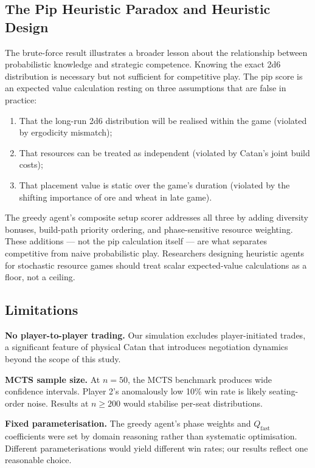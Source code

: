 \documentclass[12pt,a4paper]{article}
\begin{document}
{\subsection{The Pip Heuristic Paradox and Heuristic Design}

The brute-force result illustrates a broader lesson about the
relationship between probabilistic knowledge and strategic competence.
Knowing the exact 2d6 distribution is necessary but not sufficient for
competitive play. The pip score is an expected value calculation resting
on three assumptions that are false in practice:

\begin{enumerate}[label=(\alph*)]
  \item That the long-run 2d6 distribution will be realised within the
  game (violated by ergodicity mismatch);
  \item That resources can be treated as independent (violated by Catan's
  joint build costs);
  \item That placement value is static over the game's duration (violated
  by the shifting importance of ore and wheat in late game).
\end{enumerate}

The greedy agent's composite setup scorer addresses all three by adding
diversity bonuses, build-path priority ordering, and phase-sensitive
resource weighting. These additions --- not the pip calculation itself ---
are what separates competitive from naive probabilistic play. Researchers
designing heuristic agents for stochastic resource games should treat
scalar expected-value calculations as a floor, not a ceiling.

\subsection{Limitations}

\textbf{No player-to-player trading.} Our simulation excludes
player-initiated trades, a significant feature of physical Catan that
introduces negotiation dynamics beyond the scope of this study.

\textbf{MCTS sample size.} At $n = 50$, the MCTS benchmark produces
wide confidence intervals. Player 2's anomalously low 10\% win rate is
likely seating-order noise. Results at $n \geq 200$ would stabilise
per-seat distributions.

\textbf{Fixed parameterisation.} The greedy agent's phase weights and
$Q_{\text{fast}}$ coefficients were set by domain reasoning rather than
systematic optimisation. Different parameterisations would yield
different win rates; our results reflect one reasonable choice.

}
\end{document}
